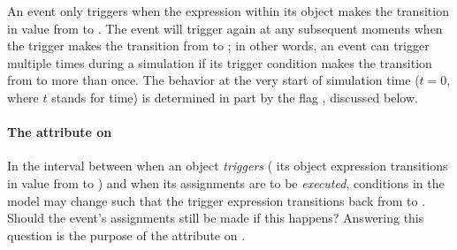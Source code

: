 An event only triggers when the expression within its \Trigger object
makes the transition in value from  to .  The
event will trigger again at any subsequent moments when the
trigger makes the transition from  to ; in
other words, an event can trigger multiple times during a simulation
if its trigger condition makes the transition from  to
 more than once.  The behavior at the very start of
simulation time (\ie $t = 0$, where $t$ stands for time) is
determined in part by the  flag
, discussed below.




\label{sec:trigger-id}



\paragraph{The  attribute on }
\label{sec:trigger-persistent}

In the interval between when an \Event object \emph{triggers} (\ie
its \Trigger object expression transitions in value from
 to ) and when its assignments are to be
\emph{executed}, conditions in the model may change such that the
trigger expression transitions back from  to
.  Should the event's assignments still be made if this
happens?  Answering this question is the purpose of the
 attribute on \Trigger.

